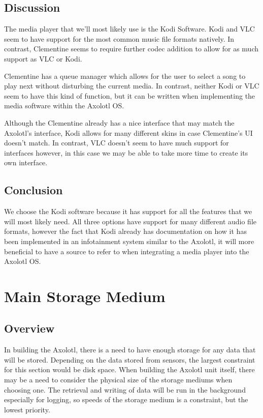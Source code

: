 \documentclass[onecolumn, draftclsnofoot,10pt, compsoc]{IEEEtran}
\begin{document}
\subsection{Discussion}
The media player that we'll most likely use is the Kodi Software.
Kodi and VLC seem to have support for the most common music file formats natively.
In contrast, Clementine seems to require further codec addition to allow for as
much support as VLC or Kodi. 

Clementine has a queue manager which allows for the user to select a song to play
next without disturbing the current media. In contrast, neither Kodi or VLC seem to
have this kind of function, but it can be written when implementing the media
software within the Axolotl OS. 

Although the Clementine already has a nice interface that may match the Axolotl's
interface, Kodi allows for many different skins in case Clementine's UI doesn't
match. In contrast, VLC doesn't seem to have much support for interfaces however, 
in this case we may be able to take more time to create its own interface.

\subsection{Conclusion}
We choose the Kodi software because it has support for all the features that we will most likely need. All three options have support for many different audio file formats, however the fact that Kodi already has documentation on how it has been implemented in an infotainment system similar to the Axolotl, it will more beneficial to have a source to refer to when integrating a media player into the Axolotl OS. 

\section{Main Storage Medium}
\subsection{Overview}
In building the Axolotl, there is a need to have enough storage for any data that will be stored. Depending on the data stored from sensors, the largest constraint for this section would be disk space. When building the Axolotl unit itself, there may be a need to consider the physical size of the storage mediums when choosing one. The retrieval and writing of data will be run in the background especially for logging, so speeds of the storage medium is a constraint, but the lowest priority.
\end{document}
